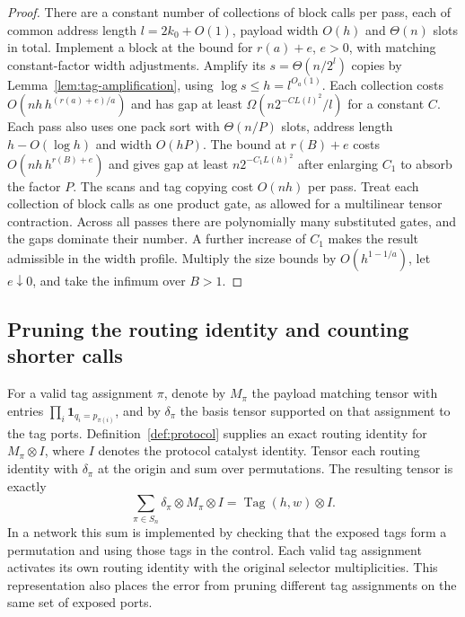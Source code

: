 \begin{proof}
There are a constant number of collections of block calls per pass,
each of common address length $l=2k_0+O(1)$, payload width $O(h)$ and
$\Theta(n)$ slots in total. Implement a block at the bound for $r(a)+e$,
$e>0$, with matching constant-factor width adjustments. Amplify its
$s=\Theta(n/2^l)$ copies by Lemma~\ref{lem:tag-amplification}, using
$\log s\le h=l^{O_a(1)}$. Each collection costs
$O(nh\,h^{(r(a)+e)/a})$ and has gap at least
$\Omega(n2^{-C L(l)^2}/l)$ for a constant $C$.
Each pass also uses one pack sort with $\Theta(n/P)$ slots, address
length $h-O(\log h)$ and width $O(hP)$. The bound at $r(B)+e$ costs
$O(nh\,h^{r(B)+e})$ and gives gap at least $n2^{-C_1 L(h)^2}$ after
enlarging $C_1$ to absorb the factor $P$. The scans and tag copying cost
$O(nh)$ per pass. Treat each collection of block calls as one product
gate, as allowed for a multilinear tensor contraction. Across all passes
there are polynomially many substituted gates, and the gaps dominate
their number. A further increase of $C_1$ makes the result admissible in
the width profile. Multiply the size bounds by $O(h^{1-1/a})$, let
$e\downarrow0$, and take the infimum over $B>1$.
\end{proof}

\subsection{Pruning the routing identity and counting shorter calls}

For a valid tag assignment $\pi$, denote by $M_\pi$ the payload
matching tensor with entries $\prod_i\mathbf{1}_{q_i=p_{\pi(i)}}$,
and by $\delta_\pi$ the basis tensor supported on that assignment to
the tag ports. Definition~\ref{def:protocol} supplies an exact routing
identity for $M_\pi\otimes I$, where $I$ denotes the protocol catalyst
identity. Tensor each routing identity with $\delta_\pi$ at the origin
and sum over permutations. The resulting tensor is exactly
\[
 \sum_{\pi\in S_n}\delta_\pi\otimes M_\pi\otimes I
       =\operatorname{Tag}(h,w)\otimes I.
\]
In a network this sum is implemented by checking that the exposed tags
form a permutation and using those tags in the control. Each valid tag
assignment activates its own routing identity with the original selector
multiplicities. This representation also places the error from pruning
different tag assignments on the same set of exposed ports.

